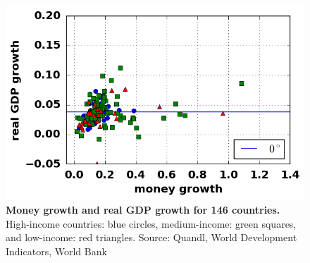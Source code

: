 \begin{figure}[h]
\caption{\label{fig:money_gdp_open} \textbf{Money growth and real GDP growth for 146 countries.} High-income countries: blue circles, medium-income: green squares, and low-income: red triangles. {\tiny Source: Quandl, World Development Indicators, World Bank}}
\hspace*{-.5cm}\includegraphics[height = 7.cm]{./png/fig_money_gdp_open.png}
\end{figure}